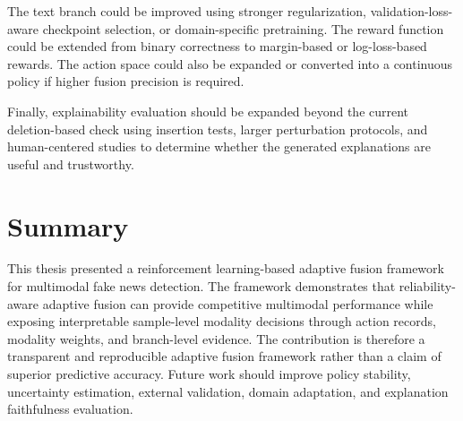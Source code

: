 The text branch could be improved using stronger regularization, validation-loss-aware checkpoint selection, or domain-specific pretraining. The reward function could be extended from binary correctness to margin-based or log-loss-based rewards. The action space could also be expanded or converted into a continuous policy if higher fusion precision is required.


Finally, explainability evaluation should be expanded beyond the current deletion-based check using insertion tests, larger perturbation protocols, and human-centered studies to determine whether the generated explanations are useful and trustworthy.


\section{Summary}


This thesis presented a reinforcement learning-based adaptive fusion framework for multimodal fake news detection. The framework demonstrates that reliability-aware adaptive fusion can provide competitive multimodal performance while exposing interpretable sample-level modality decisions through action records, modality weights, and branch-level evidence. The contribution is therefore a transparent and reproducible adaptive fusion framework rather than a claim of superior predictive accuracy. Future work should improve policy stability, uncertainty estimation, external validation, domain adaptation, and explanation faithfulness evaluation.

\clearpage
